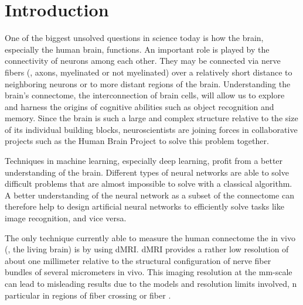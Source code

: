 \newpage\null\thispagestyle{empty}\newpage
\clearpage{\thispagestyle{empty}\cleardoublepage}
\cleardoublepage
% 
% 
% 
\setcounter{chapter}{0}
\chapter{Introduction}
\label{sec:intro}
% 
One of the biggest unsolved questions in science today is how the brain, especially the human brain, functions.
An important role is played by the connectivity of neurons among each other.
They may be connected via nerve fibers (\ie{}, axons, myelinated or not myelinated) over a relatively short distance to neighboring neurons or to more distant regions of the brain.
Understanding the brain's connectome, the interconnection of brain cells, will allow us to explore and harness the origins of cognitive abilities such as object recognition and memory.
Since the brain is such a large and complex structure relative to the size of its individual building blocks, neuroscientists are joining forces in collaborative projects such as the Human Brain Project to solve this problem together.\\
\cite{Markram2006, Shen2012, Amunts2013, Amunts2016}
\par
% 
Techniques in machine learning, especially deep learning, profit from a better understanding of the brain.
Different types of neural networks are able to solve difficult problems that are almost impossible to solve with a classical algorithm.
A better understanding of the neural network as a subset of the connectome can therefore help to design artificial neural networks to efficiently solve tasks like image recognition, and vice versa. \\
\cite{murphy2013machine, Goodfellow-et-al-2016}
\par
% 
The only technique currently able to measure the human connectome the in vivo (\ie{}, the living brain) is by using \ac{dMRI}.
\ac{dMRI} provides a rather low resolution of about one millimeter relative to the structural configuration of nerve fiber bundles of several micrometers in vivo.
This imaging resolution at the \si{\milli\meter}-scale can lead to misleading results due to the models and resolution limits involved, n particular in regions of fiber crossing or fiber  \cite{MaierHein2017}.
